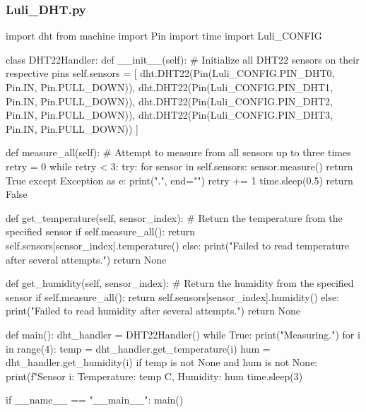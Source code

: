 \documentclass[12pt]{article} %
\begin{document}
\subsubsection{Luli\_DHT.py}
\begin{pythoncode}[caption={Pico W DHT22 Sensor Code}]
    import dht
    from machine import Pin
    import time
    import Luli_CONFIG
    
    class DHT22Handler:
        def __init__(self):
            # Initialize all DHT22 sensors on their respective pins
            self.sensors = [
                dht.DHT22(Pin(Luli_CONFIG.PIN_DHT0, Pin.IN, Pin.PULL_DOWN)),
                dht.DHT22(Pin(Luli_CONFIG.PIN_DHT1, Pin.IN, Pin.PULL_DOWN)),
                dht.DHT22(Pin(Luli_CONFIG.PIN_DHT2, Pin.IN, Pin.PULL_DOWN)),
                dht.DHT22(Pin(Luli_CONFIG.PIN_DHT3, Pin.IN, Pin.PULL_DOWN))
            ]
    
        def measure_all(self):
            # Attempt to measure from all sensors up to three times
            retry = 0
            while retry < 3:
                try:
                    for sensor in self.sensors:
                        sensor.measure()
                    return True
                except Exception as e:
                    print(".", end="")
                    retry += 1
                    time.sleep(0.5)
            return False
    
        def get_temperature(self, sensor_index):
            # Return the temperature from the specified sensor
            if self.measure_all():
                return self.sensors[sensor_index].temperature()
            else:
                print("Failed to read temperature after several attempts.")
                return None
    
        def get_humidity(self, sensor_index):
            # Return the humidity from the specified sensor
            if self.measure_all():
                return self.sensors[sensor_index].humidity()
            else:
                print("Failed to read humidity after several attempts.")
                return None
            
    def main():
        dht_handler = DHT22Handler()
        while True:
            print("Measuring.")
            for i in range(4):
                temp = dht_handler.get_temperature(i)
                hum = dht_handler.get_humidity(i)
                if temp is not None and hum is not None:
                    print(f"Sensor {i}: Temperature: {temp} C, Humidity: {hum} %
            time.sleep(3)
    
    if __name__ == "__main__":
        main()
    
    
\end{pythoncode}
\end{document}

